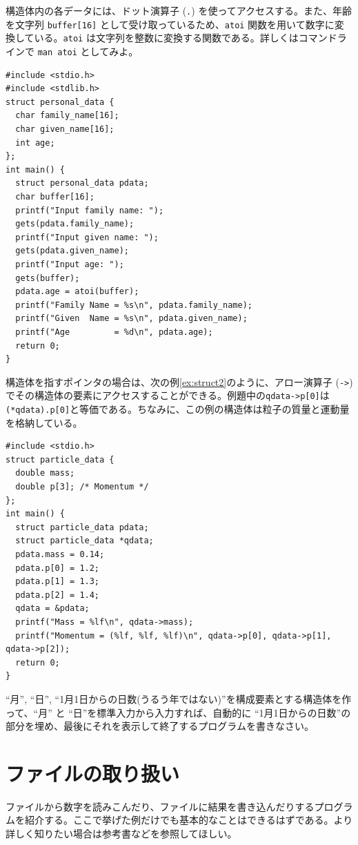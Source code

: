 構造体内の各データには、ドット演算子 (\verb|.|) を使ってアクセスする。また、年齢を文字列 \verb|buffer[16]| として受け取っているため、\verb|atoi| 関数を用いて数字に変換している。\verb|atoi| は文字列を整数に変換する関数である。詳しくはコマンドラインで \verb|man atoi| としてみよ。
\begin{reidai}\label{ex:struct1}
\begin{verbatim}
#include <stdio.h>
#include <stdlib.h>
struct personal_data {
  char family_name[16];
  char given_name[16];
  int age;
};
int main() {
  struct personal_data pdata;
  char buffer[16];
  printf("Input family name: ");
  gets(pdata.family_name);
  printf("Input given name: ");
  gets(pdata.given_name);
  printf("Input age: ");
  gets(buffer);
  pdata.age = atoi(buffer);
  printf("Family Name = %s\n", pdata.family_name);
  printf("Given  Name = %s\n", pdata.given_name);
  printf("Age         = %d\n", pdata.age);
  return 0;
}
\end{verbatim}
\end{reidai} \noindent
構造体を指すポインタの場合は、次の例\ref{ex:struct2}のように、アロー演算子 (\verb|->|) でその構造体の要素にアクセスすることができる。例題中の\verb|qdata->p[0]|は\verb|(*qdata).p[0]|と等価である。ちなみに、この例の構造体は粒子の質量と運動量を格納している。
\begin{reidai}\label{ex:struct2}
\begin{verbatim}
#include <stdio.h>
struct particle_data {
  double mass;
  double p[3]; /* Momentum */
};
int main() {
  struct particle_data pdata;
  struct particle_data *qdata;
  pdata.mass = 0.14;
  pdata.p[0] = 1.2;
  pdata.p[1] = 1.3;
  pdata.p[2] = 1.4;
  qdata = &pdata;
  printf("Mass = %lf\n", qdata->mass);
  printf("Momentum = (%lf, %lf, %lf)\n", qdata->p[0], qdata->p[1], qdata->p[2]);
  return 0;
}
\end{verbatim}
\end{reidai}
\begin{renshuu}\label{prob:7-1}
``月'', ``日'', ``1月1日からの日数(うるう年ではない)''を構成要素とする構造体を作って、``月'' と ``日''を標準入力から入力すれば、自動的に ``1月1日からの日数''の部分を埋め、最後にそれを表示して終了するプログラムを書きなさい。
\end{renshuu}

\section{ファイルの取り扱い}

ファイルから数字を読みこんだり、ファイルに結果を書き込んだりするプログラムを紹介する。ここで挙げた例だけでも基本的なことはできるはずである。より詳しく知りたい場合は参考書などを参照してほしい。

